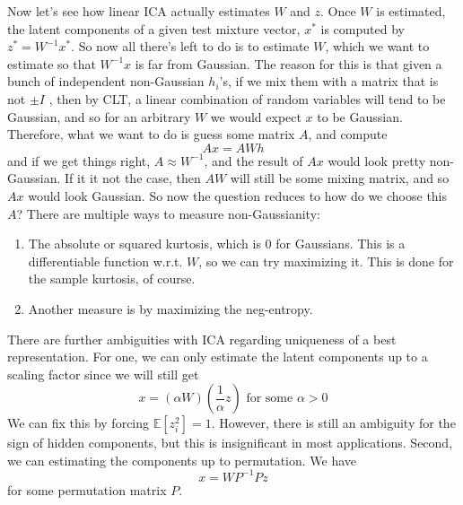   \begin{algo}[Fitting]
    Now let's see how linear ICA actually estimates $W$ and $z$. Once $W$ is estimated, the latent components of a given test mixture vector, $x^\ast$ is computed by $z^\ast = W^{-1} x^\ast$. So now all there's left to do is to estimate $W$, which we want to estimate so that $W^{-1} x$ is far from Gaussian. The reason for this is that given a bunch of independent non-Gaussian $h_i$'s, if we mix them with a matrix that is not $\pm I$ , then by CLT, a linear combination of random variables will tend to be Gaussian, and so for an arbitrary $W$ we would expect $x$ to be Gaussian. Therefore, what we want to do is guess some matrix $A$, and compute 
    \begin{equation}
      A x = A W h
    \end{equation}
    and if we get things right, $A \approx W^{-1}$, and the result of $A x$ would look pretty non-Gaussian. If it it not the case, then $A W$ will still be some mixing matrix, and so $A x$ would look Gaussian. So now the question reduces to how do we choose this $A$? There are multiple ways to measure non-Gaussianity: 
    \begin{enumerate} 
      \item The absolute or squared kurtosis, which is $0$ for Gaussians. This is a differentiable function w.r.t. $W$, so we can try maximizing it. This is done for the sample kurtosis, of course.  
      \item Another measure is by maximizing the neg-entropy. 
    \end{enumerate}
  \end{algo}

  There are further ambiguities with ICA regarding uniqueness of a best representation. For one, we can only estimate the latent components up to a scaling factor since we will still get
  \begin{equation}
    x = (\alpha W) (\frac{1}{\alpha} z) \text{ for some } \alpha > 0
  \end{equation}
  We can fix this by forcing $\mathbb{E}[z_i^2] = 1$. However, there is still an ambiguity for the sign of hidden components, but this is insignificant in most applications. Second, we can estimating the components up to permutation. We have 
  \begin{equation}
    x = W P^{-1} P z
  \end{equation}
  for some permutation matrix $P$. 

